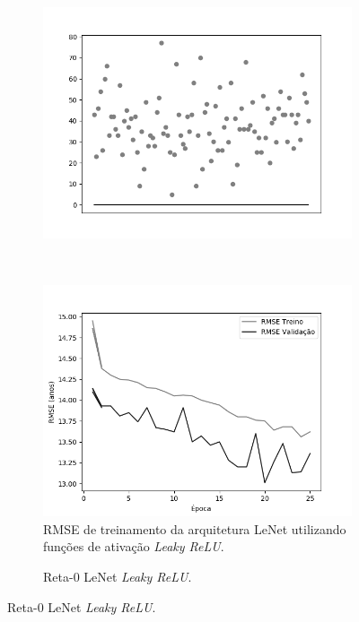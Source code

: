 \begin{figure}[hb!]
\begin{subfigure}[hb]{0.5\linewidth}
			\includegraphics[width=\linewidth]{img/graficos/reta0/lenet/fig-reta-0-image-treat-2-lenet-relu.png}%
		\end{subfigure}\\
		\begin{subfigure}[hb]{0.5\linewidth}
			\caption{RMSE de treinamento da arquitetura LeNet utilizando funções de ativação \emph{Leaky ReLU}.}
			\label{fig:redeneuralbiologica}
			\includegraphics[width=\linewidth]{img/graficos/history/lenet/fig-history-image-treat-2-lenet-lrelu-rmse.png}
		\end{subfigure}
		\begin{subfigure}[hb]{0.5\linewidth}
			\caption{Reta-0 LeNet \emph{Leaky ReLU}.}
			\label{fig:redeneuralbiologica}

\end{subfigure}
\end{figure}

